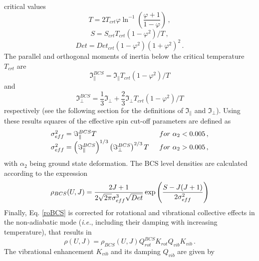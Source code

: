 critical values
\begin{equation}
T=2T_{crt}\varphi\ln^{-1}\left(\frac{\varphi+1}{1-\varphi}\right)\,,
\label{Tign}
\end{equation}
\begin{equation}
S=S_{crt}T_{crt}(1-\varphi^{2})/T\,,  \label{Sign}
\end{equation}
\begin{equation}
Det=Det_{crt}(1-\varphi^{2})(1+\varphi^{2})^{2}\,.  \label{Detign}
\end{equation}
The parallel and orthogonal moments of inertia below the critical
temperature $T_{crt}$ are
\begin{equation}
\Im_{\parallel}^{BCS}=\Im_{\parallel}T_{crt}(1-\varphi^{2})/T
\label{momparign}
\end{equation}
and
\begin{equation}
\Im_{\perp}^{BCS}=\frac{1}{3}\Im_{\perp}+\frac{2}{3}\Im_{\perp}T_{crt}(1-%
\varphi^{2})/T  \label{momortign}
\end{equation}
respectively (see the following section for the definitions of $%
\Im_{\parallel}$ and $\Im_{\perp}$). Using these results squares of the
effective spin cut-off parameters are defined as
\begin{equation}
\begin{array}{ll}
\sigma_{eff}^{2}=\Im_{\parallel}^{BCS}T & \,\,\, for\,\,\alpha_{2}<0.005\,,
\\
\sigma_{eff}^{2}=\left(\Im_{\parallel}^{BCS}\right)^{1/3}\left(\Im_{%
\perp}^{BCS}\right)^{2/3}T & \,\,\, for\,\,\alpha_{2}>0.005\,,%
\end{array}
\label{sigeffign}
\end{equation}
with $\alpha_{2}$ being ground state deformation. The BCS%
 level densities%
 are calculated according to the expression
\begin{equation}
\rho_{BCS}(U,J)=%
\frac{2J+1}{2\sqrt{2\pi}\sigma_{eff}^{3}\sqrt{Det}}\exp\left(\frac{S-J(J+1)}{%
2\sigma_{eff}^{2}}\right)  \label{roBCS}
\end{equation}
Finally, Eq. \ref{roBCS} is corrected for rotational and vibrational
collective effects in the non-adiabatic mode (\textit{i.e.}, including their
damping with increasing temperature), that results in
\begin{equation}
\rho(U,J)=\rho_{BCS}(U,J)Q_{rot}^{BCS}K_{rot}Q_{vib}K_{vib}\,.
\label{roBCScol}
\end{equation}
The vibrational enhancement $K_{vib}$ and its damping $Q_{vib}$ are given by
